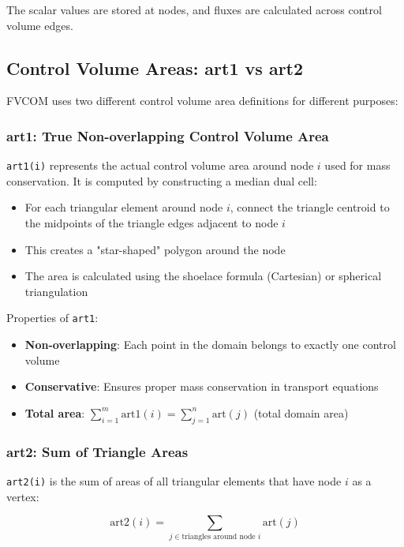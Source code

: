 \documentclass[11pt,a4paper]{article}
\begin{document}
The scalar values are stored at nodes, and fluxes are calculated across control volume edges.

\subsection{Control Volume Areas: art1 vs art2}

FVCOM uses two different control volume area definitions for different purposes:

\subsubsection{art1: True Non-overlapping Control Volume Area}

\texttt{art1(i)} represents the actual control volume area around node $i$ used for mass conservation. It is computed by constructing a median dual cell:

\begin{itemize}
\item For each triangular element around node $i$, connect the triangle centroid to the midpoints of the triangle edges adjacent to node $i$
\item This creates a "star-shaped" polygon around the node
\item The area is calculated using the shoelace formula (Cartesian) or spherical triangulation
\end{itemize}

Properties of \texttt{art1}:
\begin{itemize}
\item \textbf{Non-overlapping}: Each point in the domain belongs to exactly one control volume
\item \textbf{Conservative}: Ensures proper mass conservation in transport equations
\item \textbf{Total area}: $\sum_{i=1}^{m} \text{art1}(i) = \sum_{j=1}^{n} \text{art}(j)$ (total domain area)
\end{itemize}

\subsubsection{art2: Sum of Triangle Areas}

\texttt{art2(i)} is the sum of areas of all triangular elements that have node $i$ as a vertex:

\begin{equation}
\text{art2}(i) = \sum_{j \in \text{triangles around node } i} \text{art}(j)
\end{equation}
\end{document}

